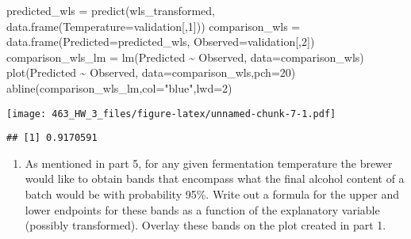 \documentclass[
]{article}
\newenvironment{Shaded}{\begin{snugshade}}{\end{snugshade}}
\newcommand{\AttributeTok}[1]{\textcolor[rgb]{0.77,0.63,0.00}{#1}}
\newcommand{\DecValTok}[1]{\textcolor[rgb]{0.00,0.00,0.81}{#1}}
\newcommand{\FunctionTok}[1]{\textcolor[rgb]{0.00,0.00,0.00}{#1}}
\newcommand{\NormalTok}[1]{#1}
\newcommand{\OtherTok}[1]{\textcolor[rgb]{0.56,0.35,0.01}{#1}}
\newcommand{\SpecialCharTok}[1]{\textcolor[rgb]{0.00,0.00,0.00}{#1}}
\newcommand{\StringTok}[1]{\textcolor[rgb]{0.31,0.60,0.02}{#1}}
\providecommand{\tightlist}{%
  \setlength{\itemsep}{0pt}\setlength{\parskip}{0pt}}
\begin{document}
\begin{Shaded}
\begin{Highlighting}[]
\NormalTok{predicted\_wls }\OtherTok{=} \FunctionTok{predict}\NormalTok{(wls\_transformed, }\FunctionTok{data.frame}\NormalTok{(}\AttributeTok{Temperature=}\NormalTok{validation[,}\DecValTok{1}\NormalTok{]))}
\NormalTok{comparison\_wls }\OtherTok{=} \FunctionTok{data.frame}\NormalTok{(}\AttributeTok{Predicted=}\NormalTok{predicted\_wls, }\AttributeTok{Observed=}\NormalTok{validation[,}\DecValTok{2}\NormalTok{])}
\NormalTok{comparison\_wls\_lm }\OtherTok{=} \FunctionTok{lm}\NormalTok{(Predicted }\SpecialCharTok{\textasciitilde{}}\NormalTok{ Observed, }\AttributeTok{data=}\NormalTok{comparison\_wls)}
\FunctionTok{plot}\NormalTok{(Predicted }\SpecialCharTok{\textasciitilde{}}\NormalTok{ Observed, }\AttributeTok{data=}\NormalTok{comparison\_wls,}\AttributeTok{pch=}\DecValTok{20}\NormalTok{)}
\FunctionTok{abline}\NormalTok{(comparison\_wls\_lm,}\AttributeTok{col=}\StringTok{"blue"}\NormalTok{,}\AttributeTok{lwd=}\DecValTok{2}\NormalTok{)}
\end{Highlighting}
\end{Shaded}

\texttt{[image: 463\_HW\_3\_files/figure-latex/unnamed-chunk-7-1.pdf]}

\begin{Shaded}
\end{Shaded}

\begin{verbatim}
## [1] 0.9170591
\end{verbatim}

\begin{enumerate}
\def\labelenumi{\arabic{enumi}.}
\setcounter{enumi}{7}
\tightlist
\item
  As mentioned in part 5, for any given fermentation temperature the
  brewer would like to obtain bands that encompass what the final
  alcohol content of a batch would be with probability 95\%. Write out a
  formula for the upper and lower endpoints for these bands as a
  function of the explanatory variable (possibly transformed). Overlay
  these bands on the plot created in part 1.
\end{enumerate}
\end{document}
